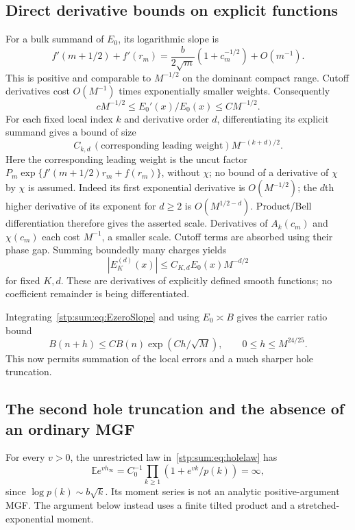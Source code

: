 \documentclass[11pt]{article}
\theoremstyle{remark}\newtheorem{remark}[theorem]{Remark}
\newcommand{\E}{\mathbb E}
\begin{document}
\subsection{Direct derivative bounds on explicit functions}
For a bulk summand of $E_0$, its logarithmic slope is
\begin{equation}\label{stp:sum:eq:bulkSlope}
 f'(m+1/2)+f'(r_m)
 =\frac{b}{2\sqrt m}(1+c_m^{-1/2})+O(m^{-1}).
\end{equation}
This is positive and comparable to $M^{-1/2}$ on the dominant compact range. Cutoff derivatives cost $O(M^{-1})$ times exponentially smaller weights. Consequently
\begin{equation}\label{stp:sum:eq:EzeroSlope}
 cM^{-1/2}\le E_0'(x)/E_0(x)\le CM^{-1/2}.
\end{equation}
For each fixed local index $k$ and derivative order $d$, differentiating its explicit summand gives a bound of size
\begin{equation}\label{stp:sum:eq:refinedDeriv}
 C_{k,d}\,(\text{corresponding leading weight})M^{-(k+d)/2}.
\end{equation}
Here the corresponding leading weight is the uncut factor $P_m\exp\{f'(m+1/2)r_m+f(r_m)\}$, without $\chi$; no bound of a derivative of $\chi$ by $\chi$ is assumed. Indeed its first exponential derivative is $O(M^{-1/2})$; the $d$th higher derivative of its exponent for $d\ge2$ is $O(M^{1/2-d})$. Product/Bell differentiation therefore gives the asserted scale. Derivatives of $A_k(c_m)$ and $\chi(c_m)$ each cost $M^{-1}$, a smaller scale. Cutoff terms are absorbed using their phase gap. Summing boundedly many charges yields
\begin{equation}\label{stp:sum:eq:Ederiv}
 |E_K^{(d)}(x)|\le C_{K,d}E_0(x)M^{-d/2}
\end{equation}
for fixed $K,d$. These are derivatives of explicitly defined smooth functions; no coefficient remainder is being differentiated.

Integrating~\eqref{stp:sum:eq:EzeroSlope} and using $E_0\asymp B$ gives the carrier ratio bound
\begin{equation}\label{stp:sum:eq:ratio}
 B(n+h)\le CB(n)\exp(Ch/\sqrt M),\qquad 0\le h\le M^{24/25}.
\end{equation}
This now permits summation of the local errors and a much sharper hole truncation.

\subsection{The second hole truncation and the absence of an ordinary MGF}
For every $v>0$, the unrestricted law in~\eqref{stp:sum:eq:holelaw} has
\[
 \E e^{v h_\infty}=C_0^{-1}\prod_{k\ge1}(1+e^{vk}/p(k))=\infty,
\]
since $\log p(k)\sim b\sqrt k$. Its moment series is not an analytic positive-argument MGF. The argument below instead uses a finite tilted product and a stretched-exponential moment.
\end{document}
